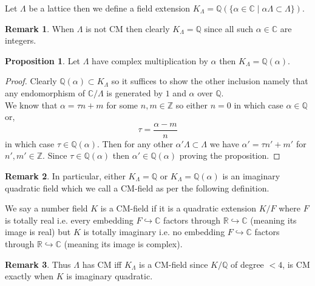 \documentclass{article}
\newcommand{\Z}{\mathbb{Z}}
\newcommand{\R}{\mathbb{R}}
\newcommand{\Q}{\mathbb{Q}}
\newcommand{\C}{\mathbb{C}}
\theoremstyle{definition}
\newtheorem{proposition}[theorem]{Proposition}
\newtheorem{remark}{Remark}[section]
\newenvironment{definition}[1][Definition:]{\begin{trivlist}
\item[\hskip \labelsep {\bfseries #1}]}{\end{trivlist}}
\begin{document}
\newcommand{\ints}[1]{\mathcal{O}_{#1}}
\newcommand{\embed}{\hookrightarrow}

\begin{definition}
Let $\Lambda$ be a lattice then we define a field extension $K_\Lambda = \Q(\{ \alpha \in \C \mid \alpha \Lambda \subset \Lambda \})$.
\end{definition}

\begin{remark}
When $\Lambda$ is not CM then clearly $K_\Lambda = \Q$ since all such $\alpha \in \C$ are integers. 
\end{remark}

\begin{proposition}
Let $\Lambda$ have complex multiplication by $\alpha$ then $K_\Lambda = \Q(\alpha)$.
\end{proposition}

\begin{proof}
Clearly $\Q(\alpha) \subset K_\Lambda$ so it suffices to show the other inclusion namely that any endomorphism of $\C / \Lambda$ is generated by $1$ and $\alpha$ over $\Q$. 
\bigskip\\
We know that $\alpha = \tau n + m$ for some $n, m \in \Z$ so either $n = 0$ in which case $\alpha \in \Q$ or,
\[ \tau = \frac{\alpha - m}{n} \]
in which case $\tau \in \Q(\alpha)$. Then for any other $\alpha' \Lambda \subset \Lambda$ we have $\alpha' = \tau n' + m'$ for $n', m' \in \Z$. Since $\tau \in \Q(\alpha)$ then $\alpha' \in \Q(\alpha)$ proving the proposition. 
\end{proof}

\begin{remark}
In particular, either $K_\Lambda = \Q$ or $K_\Lambda = \Q(\alpha)$ is an imaginary quadratic field which we call a CM-field as per the following definition. 
\end{remark}

\begin{definition}
We say a number field $K$ is a CM-field if it is a quadratic extension $K / F$ where $F$ is totally real i.e. every embedding $F \embed \C$ factors through $\R \embed \C$ (meaning its image is real) but $K$ is totally imaginary i.e. no embedding $F \embed \C$ factors through $\R \embed \C$ (meaning its image is complex). 
\end{definition}

\begin{remark}
Thus $\Lambda$ has CM iff $K_\Lambda$ is a CM-field since $K / \Q$ of degree $ < 4$, is CM exactly when $K$ is imaginary quadratic. 
\end{remark}
\end{document}
